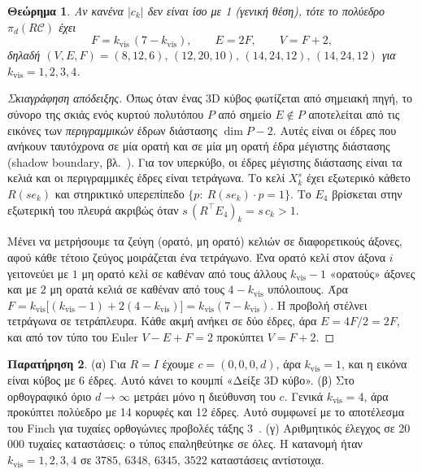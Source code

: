 \documentclass[10pt,a4paper]{article}
\theoremstyle{plain}
\newtheorem{theorem}{Θεώρημα}
\theoremstyle{definition}
\newtheorem{remark}[theorem]{Παρατήρηση}
\newcommand{\C}{\mathcal{C}}
\newcommand{\eng}[1]{\textenglish{#1}}
\begin{document}
\begin{theorem}\label{thm:cells}
Αν κανένα $|c_k|$ δεν είναι ίσο με 1 (γενική θέση), τότε το πολύεδρο $\pi_d(R\C)$ έχει
\[
F=k_{\mathrm{vis}}\,(7-k_{\mathrm{vis}}),\qquad E=2F,\qquad V=F+2,
\]
δηλαδή $(V,E,F)=(8,12,6),\,(12,20,10),\,(14,24,12),\,(14,24,12)$ για $k_{\mathrm{vis}}=1,2,3,4$.
\end{theorem}
\begin{proof}[Σκιαγράφηση απόδειξης]
Όπως όταν ένας 3D κύβος φωτίζεται από σημειακή πηγή, το σύνορο της σκιάς ενός κυρτού πολυτόπου $P$ από σημείο $E\notin P$ αποτελείται από τις εικόνες των \emph{περιγραμμικών} έδρων διάστασης $\dim P-2$. Αυτές είναι οι έδρες που ανήκουν ταυτόχρονα σε μία ορατή και σε μία μη ορατή έδρα μέγιστης διάστασης (\eng{shadow boundary}, βλ.~\cite{ziegler}). Για τον υπερκύβο, οι έδρες μέγιστης διάστασης είναι τα κελιά και οι περιγραμμικές έδρες είναι τετράγωνα. Το κελί $X_k^s$ έχει εξωτερικό κάθετο $R(se_k)$ και στηρικτικό υπερεπίπεδο $\{p:\ R(se_k)\cdot p=1\}$. Το $E_4$ βρίσκεται στην εξωτερική του πλευρά ακριβώς όταν $s\,(R^\top E_4)_k=s\,c_k>1$.

Μένει να μετρήσουμε τα ζεύγη (ορατό, μη ορατό) κελιών σε διαφορετικούς άξονες, αφού κάθε τέτοιο ζεύγος μοιράζεται ένα τετράγωνο. Ένα ορατό κελί στον άξονα $i$ γειτονεύει με $1$ μη ορατό κελί σε καθέναν από τους άλλους $k_{\mathrm{vis}}-1$ «ορατούς» άξονες και με $2$ μη ορατά κελιά σε καθέναν από τους $4-k_{\mathrm{vis}}$ υπόλοιπους. Άρα $F=k_{\mathrm{vis}}\bigl[(k_{\mathrm{vis}}-1)+2(4-k_{\mathrm{vis}})\bigr]=k_{\mathrm{vis}}(7-k_{\mathrm{vis}})$. Η προβολή στέλνει τετράγωνα σε τετράπλευρα. Κάθε ακμή ανήκει σε δύο έδρες, άρα $E=4F/2=2F$, και από τον τύπο του Euler $V-E+F=2$ προκύπτει $V=F+2$.
\end{proof}

\begin{remark}
(α) Για $R=I$ έχουμε $c=(0,0,0,d)$, άρα $k_{\mathrm{vis}}=1$, και η εικόνα είναι κύβος με 6 έδρες. Αυτό κάνει το κουμπί «Δείξε 3D κύβο».
(β) Στο ορθογραφικό όριο $d\to\infty$ μετράει μόνο η διεύθυνση του $c$. Γενικά $k_{\mathrm{vis}}=4$, άρα προκύπτει πολύεδρο με 14 κορυφές και 12 έδρες. Αυτό συμφωνεί με το αποτέλεσμα του \eng{Finch} για τυχαίες ορθογώνιες προβολές τάξης 3~\cite{finch}.
(γ) Αριθμητικός έλεγχος σε 20\,000 τυχαίες καταστάσεις: ο τύπος επαληθεύτηκε σε όλες. Η κατανομή ήταν $k_{\mathrm{vis}}=1,2,3,4$ σε $3785,\,6348,\,6345,\,3522$ καταστάσεις αντίστοιχα.
\end{remark}

\end{document}
